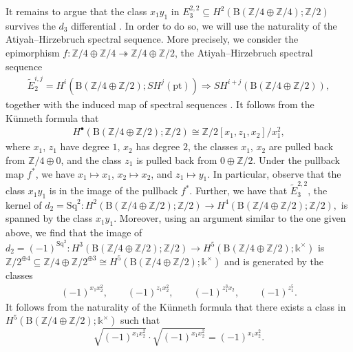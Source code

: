 \documentclass[10pt,a4paper]{amsart}
\numberwithin{equation}{section}
\begin{document}
It remains to argue that the class $x_1y_1$ in $E_3^{2,2}\subseteq H^2(\mathrm{B}(\mathbb{Z}/4\oplus\mathbb{Z}/4);\mathbb{Z}/2)$ survives the $d_3$ differential . In order to do so, we will use the naturality of the Atiyah--Hirzebruch spectral sequence. More precisely, we consider the epimorphism $f\colon \mathbb{Z}/4\oplus\mathbb{Z}/4\twoheadrightarrow \mathbb{Z}/4\oplus\mathbb{Z}/2$, the Atiyah--Hirzebruch spectral sequence
 \begin{gather*}
\widetilde{E}^{i,j}_2=H^i(\mathrm{B}(\mathbb{Z}/4\oplus \mathbb{Z}/2);SH^j(\mathrm{pt}))\Rightarrow SH^{i+j}(\mathrm{B}(\mathbb{Z}/4\oplus \mathbb{Z}/2)),
\end{gather*}
 together with the induced map of spectral sequences . It follows from the K\"unneth formula that
 \begin{gather*}
 H^{\bullet}(\mathrm{B}(\mathbb{Z}/4\oplus\mathbb{Z}/2);\mathbb{Z}/2)\cong \mathbb{Z}/2[x_1,z_1,x_2]/x_1^2,
 \end{gather*}
 where $x_1$, $z_1$ have degree $1$, $x_2$ has degree $2$, the classes $x_1$, $x_2$ are pulled back from $\mathbb{Z}/4\oplus 0$, and the class $z_1$ is pulled back from $0\oplus \mathbb{Z}/2$. Under the pullback map $f^*$, we have $x_1\mapsto x_1$, $x_2\mapsto x_2$, and $z_1\mapsto y_1$. In particular, observe that the class $x_1y_1$ is in the image of the pullback $f^*$. Further, we have that $\widetilde{E}_3^{2,2}$, the kernel of $d_2=\mathrm{Sq}^2\colon H^2(\mathrm{B}(\mathbb{Z}/4\oplus\mathbb{Z}/2);\mathbb{Z}/2)\rightarrow H^4(\mathrm{B}(\mathbb{Z}/4\oplus\mathbb{Z}/2);\mathbb{Z}/2),$ is spanned by the class $x_1y_1$. Moreover, using an argument similar to the one given above, we find that the image of $d_2=(-1)^{\mathrm{Sq}^2}\colon H^3(\mathrm{B}(\mathbb{Z}/4\oplus\mathbb{Z}/2);\mathbb{Z}/2)\rightarrow H^5(\mathrm{B}(\mathbb{Z}/4\oplus\mathbb{Z}/2);\mathds{k}^{\times})$ is~$\mathbb{Z}/2^{\oplus 4}\subseteq \mathbb{Z}/4\oplus\mathbb{Z}/2^{\oplus 3}\cong H^5(\mathrm{B}(\mathbb{Z}/4\oplus\mathbb{Z}/2);\mathds{k}^{\times})$ and is generated by the classes \begin{gather*}
 (-1)^{x_1x_2^2},\qquad (-1)^{z_1x_2^2},\qquad (-1)^{z_1^3x_2},\qquad (-1)^{z_1^5}.
 \end{gather*}
 It follows from the naturality of the K\"unneth formula that there exists a class  in $H^5(\mathrm{B}(\mathbb{Z}/4\oplus\mathbb{Z}/2);\mathds{k}^{\times})$ such that
 \[
 \sqrt{(-1)^{x_1x_2^2}}\cdot \sqrt{(-1)^{x_1x_2^2}} = (-1)^{x_1x_2^2}.
 \]
\end{document}
